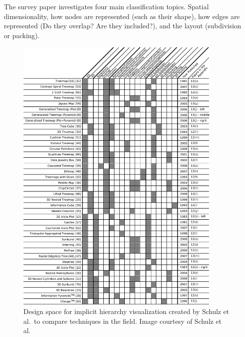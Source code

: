 The survey paper investigates four main classification topics. Spatial dimensionality, how nodes are represented (such as their shape), how edges are represented (Do they overlap? Are they included?), and the layout (subdivision or packing).

\begin{figure}[p]
\begin{center}
\includegraphics[width=0.9\textwidth]{images/schulz2011designFull}
\caption{Design space for implicit hierarchy visualization created by Schulz et al.\ to compare techniques in the field. Image courtesy of Schulz et al.\ \cite{schulz2011design}} \label{fig: shulz2011design}
\end{center}
\vspace{-0.5cm}
\end{figure}

